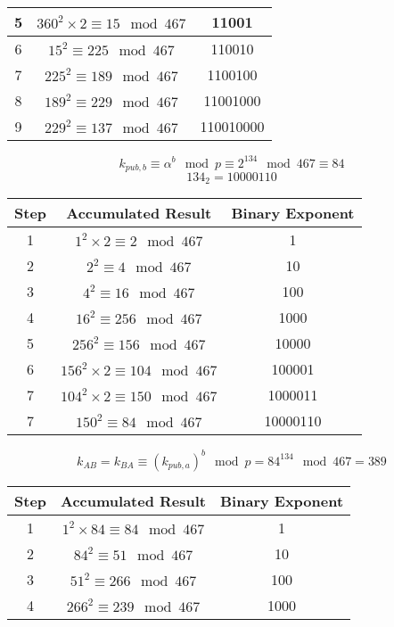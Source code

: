 \documentclass{math}
\begin{document}
\begin{enumerate}
\begin{center}
\begin{tabular}{|c|c|c|}
      \hline
      5 & \( 360^2\times2 \equiv 15\mod467 \) & 11001 \\
      \hline
      6 & \( 15^2 \equiv 225\mod467 \) & 110010 \\
      \hline
      7 & \( 225^2 \equiv 189\mod467 \) & 1100100 \\
      \hline
      8 & \( 189^2 \equiv 229\mod467 \) & 11001000 \\
      \hline
      9 & \( 229^2 \equiv 137\mod467 \) & 110010000 \\
      \hline
    \end{tabular}
  \end{center}
  \[ k_{pub,b} \equiv \alpha^b\mod p \equiv 2^{134}\mod467 \equiv 84 \]
  \[ 134_2 = 10000110 \]
  \begin{center}
    \begin{tabular}{|c|c|c|}
      \hline
      Step & Accumulated Result & Binary Exponent \\
      \hline
      1 & \( 1^2\times2 \equiv 2\mod467 \) & 1 \\
      \hline
      2 & \( 2^2 \equiv 4\mod467 \) & 10 \\
      \hline
      3 & \( 4^2 \equiv 16\mod467 \) & 100 \\
      \hline
      4 & \( 16^2 \equiv 256\mod467 \) & 1000 \\
      \hline
      5 & \( 256^2 \equiv 156\mod467 \) & 10000 \\
      \hline
      6 & \( 156^2\times2 \equiv 104\mod467 \) & 100001 \\
      \hline
      7 & \( 104^2\times2 \equiv 150\mod467 \) & 1000011 \\
      \hline
      7 & \( 150^2 \equiv 84\mod467 \) & 10000110 \\
      \hline
    \end{tabular}
  \end{center}
  \[ k_{AB} = k_{BA} \equiv (k_{pub,a})^b\mod p = 84^{134}\mod467 = 389 \]
  \begin{center}
    \begin{tabular}{|c|c|c|}
      \hline
      Step & Accumulated Result & Binary Exponent \\
      \hline
      1 & \( 1^2\times84 \equiv 84\mod467 \) & 1 \\
      \hline
      2 & \( 84^2 \equiv 51\mod467 \) & 10 \\
      \hline
      3 & \( 51^2 \equiv 266\mod467 \) & 100 \\
      \hline
      4 & \( 266^2 \equiv 239\mod467 \) & 1000 \\

\end{tabular}
\end{center}
\end{enumerate}
\end{document}
